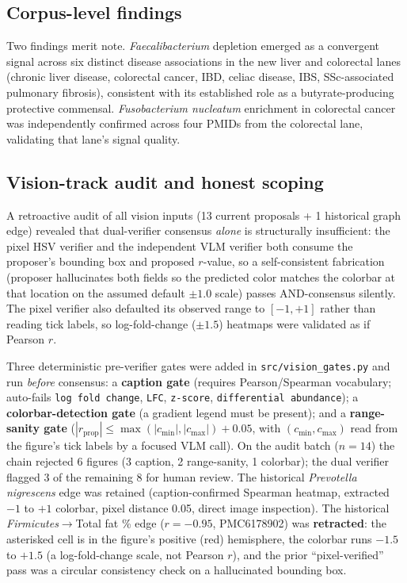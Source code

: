 \documentclass[10pt,twocolumn,letterpaper]{article}
\begin{document}
\subsection{Corpus-level findings}

Two findings merit note. \textit{Faecalibacterium} depletion emerged as a
convergent signal across six distinct disease associations in the new liver
and colorectal lanes (chronic liver disease, colorectal cancer, IBD, celiac
disease, IBS, SSc-associated pulmonary fibrosis), consistent with its
established role as a butyrate-producing protective commensal.
\textit{Fusobacterium nucleatum} enrichment in colorectal cancer was
independently confirmed across four PMIDs from the colorectal lane,
validating that lane's signal quality.

\subsection{Vision-track audit and honest scoping}
\label{sec:visionaudit}

A retroactive audit of all vision inputs (13 current proposals + 1 historical
graph edge) revealed that dual-verifier consensus \emph{alone} is
structurally insufficient: the pixel HSV verifier and the independent VLM
verifier both consume the proposer's bounding box and proposed $r$-value, so
a self-consistent fabrication (proposer hallucinates both fields so the
predicted color matches the colorbar at that location on the assumed default
$\pm1.0$ scale) passes AND-consensus silently. The pixel verifier also
defaulted its observed range to $[-1,+1]$ rather than reading tick labels, so
log-fold-change ($\pm1.5$) heatmaps were validated as if Pearson $r$.

Three deterministic pre-verifier gates were added in
\texttt{src/vision\_gates.py} and run \emph{before} consensus: a
\textbf{caption gate} (requires Pearson/Spearman vocabulary; auto-fails
\texttt{log fold change}, \texttt{LFC}, \texttt{z-score}, \texttt{differential
abundance}); a \textbf{colorbar-detection gate} (a gradient legend must be
present); and a \textbf{range-sanity gate}
($|r_{\text{prop}}|\leq\max(|c_{\min}|,|c_{\max}|)+0.05$, with
$(c_{\min},c_{\max})$ read from the figure's tick labels by a focused VLM
call). On the audit batch ($n{=}14$) the chain rejected 6 figures (3 caption,
2 range-sanity, 1 colorbar); the dual verifier flagged 3 of the remaining 8
for human review. The historical \textit{Prevotella nigrescens} edge was
retained (caption-confirmed Spearman heatmap, extracted $-1$ to $+1$
colorbar, pixel distance 0.05, direct image inspection). The historical
\textit{Firmicutes}$\rightarrow$Total fat \% edge ($r=-0.95$, PMC6178902) was
\textbf{retracted}: the asterisked cell is in the figure's positive (red)
hemisphere, the colorbar runs $-1.5$ to $+1.5$ (a log-fold-change scale, not
Pearson $r$), and the prior ``pixel-verified'' pass was a circular
consistency check on a hallucinated bounding box.
\end{document}
